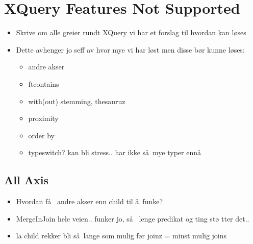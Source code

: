 \section{XQuery Features Not Supported}
\label{sect:discussion:notSupported}
\begin{itemize}
  \item Skrive om alle greier rundt XQuery vi har et forslag til hvordan kan
  l\o ses
  \item Dette avhenger jo seff av hvor mye vi har l\o st men disse b\o r kunne
  l\o ses:
  	\begin{itemize}
  		\item andre akser
  		\item ftcontains 
  		\item with(out) stemming, thesauruz
  		\item proximity
  		\item order by
  		\item typeswitch? kan bli stress.. har ikke s\aa~mye typer enn\aa 
  		\end{itemize}
	\end{itemize}

\subsection{All Axis}
\label{sect:discussion:notAxis}
\begin{itemize}
  \item Hvordan f\aa~ andre akser enn child til \aa~funke?
  \item MergeInJoin hele veien.. funker jo, s\aa~ lenge predikat og ting st\o
  tter det..
  \item la child rekker bli s\aa~lange som mulig f\o r joinz = minst mulig joins
\end{itemize}
